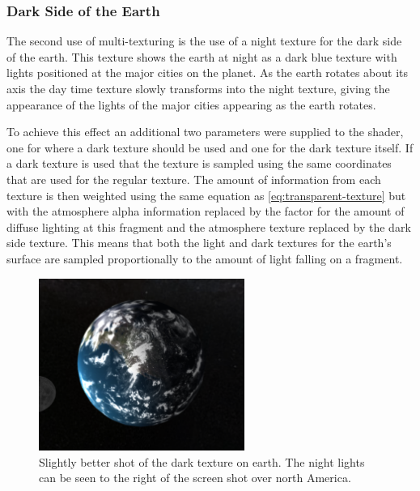 \documentclass[paper=a4, fontsize=11pt]{scrartcl}	%
\numberwithin{equation}{section}															%
\numberwithin{figure}{section}																%
\numberwithin{table}{section}																%
\begin{document}
\subsubsection{Dark Side of the Earth}
The second use of multi-texturing is the use of a night texture for the dark side of the earth. This texture shows the earth at night as a dark blue texture with lights positioned at the major cities on the planet. As the earth rotates about its axis the day time texture slowly transforms into the night texture, giving the appearance of the lights of the major cities appearing as the earth rotates. 

To achieve this effect an additional two parameters were supplied to the shader, one for where a dark texture should be used and one for the dark texture itself. If a dark texture is used that the texture is sampled using the same coordinates that are used for the regular texture. The amount of information from each texture is then weighted using the same equation as \ref{eq:transparent-texture} but with the atmosphere alpha information replaced by the factor for the amount of diffuse lighting at this fragment and the atmosphere texture replaced by the dark side texture. This means that both the light and dark textures for the earth's surface are sampled proportionally to the amount of light falling on a fragment.

\begin{figure}[H]
\centering
\includegraphics[width=0.6\textwidth]{img/earth_dark.png}
\caption{Slightly better shot of the dark texture on earth. The night lights can be seen to the right of the screen shot over north America.}
\label{fig:earth-dark}
\end{figure}
\end{document}
